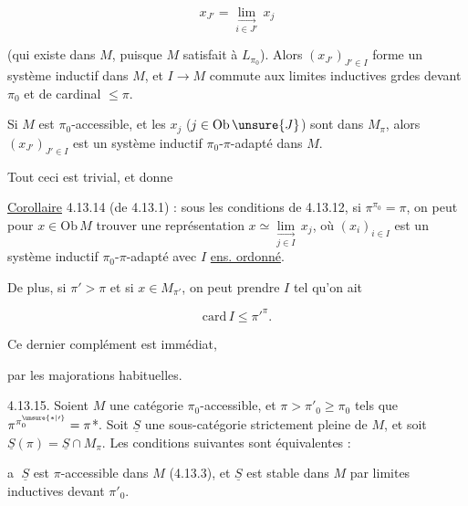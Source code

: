 \[
x_{J'}=\underset{i\in J'}{\underset{\longrightarrow}{\lim}}\,x_j
\]


(qui existe dans $M$, puisque $M$ satisfait à $L_{\pi_0}$). Alors  $(x_{J'})_{J'\in I}$ forme un système inductif dans $M$, et $I\longrightarrow M$ commute aux limites inductives grdes devant $\pi_0$ et de cardinal $\leq\pi$.

Si $M$ est $\pi_0$-accessible, et les $x_j$ ($j\in\mathrm{Ob}\,\unsure{J}$) sont dans $M_\pi$, alors $(x_{J'})_{J'\in I}$ est un système inductif $\pi_0$-$\pi$-adapté dans $M$.

Tout ceci est  trivial, et donne

\uline{Corollaire} 4.13.14 (de 4.13.1) : sous les conditions de 4.13.12, si $\pi^{\pi_0}=\pi$, on peut pour  $x\in\mathrm{Ob}\,M$ trouver une représentation $x\simeq\underset{j\in I}{\underset{\longrightarrow}{\lim}}\,x_j$, où $(x_i)_{i\in I}$ est un système inductif $\pi_0$-$\pi$-adapté avec $I$ \uline{ens. ordonné}.

 De plus, si $\pi'>\pi$ et si $x\in M_{\pi'}$, on peut prendre $I$ tel qu'on ait

\[
\mathrm{card}\,I\leq{\pi'}^{\pi}.
\]

Ce dernier complément est immédiat,


par les majorations habituelles.


  4.13.15. Soient $M$ une catégorie $\pi_0$-accessible, et $\pi>\pi'_0\geq\pi_0$ tels que $\pi^{\pi_0^{\unsure{*|\prime}}}=\pi$*. Soit $\underline S$ une sous-catégorie strictement pleine de $M$, et soit $\underline S(\pi)=\underline S\cap M_\pi$. Les conditions suivantes sont équivalentes :


\textcircled{a} $\underline S$ est $\pi$-accessible dans $M$ (4.13.3),  et $\underline S$ est stable dans $M$ par limites inductives   devant $\pi'_0$.

